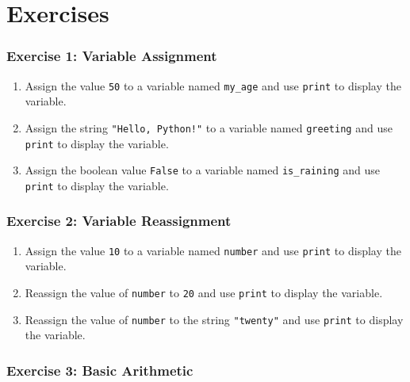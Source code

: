 \documentclass[
  letterpaper,
  DIV=11,
  numbers=noendperiod]{scrreprt}
\providecommand{\tightlist}{%
  \setlength{\itemsep}{0pt}\setlength{\parskip}{0pt}}\usepackage{longtable,booktabs,array}
\begin{document}
\hypertarget{exercises}{%
\section{Exercises}\label{exercises}}

\hypertarget{exercise-1-variable-assignment}{%
\subsubsection{Exercise 1: Variable
Assignment}\label{exercise-1-variable-assignment}}

\begin{enumerate}
\def\labelenumi{\alph{enumi}.}
\tightlist
\item
  Assign the value \texttt{50} to a variable named \texttt{my\_age} and
  use \texttt{print} to display the variable.
\item
  Assign the string \texttt{"Hello,\ Python!"} to a variable named
  \texttt{greeting} and use \texttt{print} to display the variable.
\item
  Assign the boolean value \texttt{False} to a variable named
  \texttt{is\_raining} and use \texttt{print} to display the variable.
\end{enumerate}

\hypertarget{exercise-2-variable-reassignment}{%
\subsubsection{Exercise 2: Variable
Reassignment}\label{exercise-2-variable-reassignment}}

\begin{enumerate}
\def\labelenumi{\alph{enumi}.}
\tightlist
\item
  Assign the value \texttt{10} to a variable named \texttt{number} and
  use \texttt{print} to display the variable.
\item
  Reassign the value of \texttt{number} to \texttt{20} and use
  \texttt{print} to display the variable.
\item
  Reassign the value of \texttt{number} to the string \texttt{"twenty"}
  and use \texttt{print} to display the variable.
\end{enumerate}

\hypertarget{exercise-3-basic-arithmetic}{%
\subsubsection{Exercise 3: Basic
Arithmetic}\label{exercise-3-basic-arithmetic}}
\end{document}
